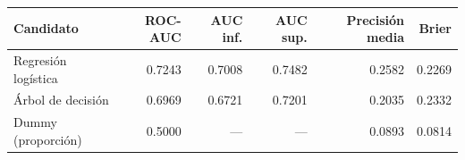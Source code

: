 \begin{tabular}{lrrrrr}
\toprule
Candidato & ROC-AUC & AUC inf. & AUC sup. & Precisión media & Brier \\
\midrule
Regresión logística & 0.7243 & 0.7008 & 0.7482 & 0.2582 & 0.2269 \\
Árbol de decisión & 0.6969 & 0.6721 & 0.7201 & 0.2035 & 0.2332 \\
Dummy (proporción) & 0.5000 & --- & --- & 0.0893 & 0.0814 \\
\bottomrule
\end{tabular}
